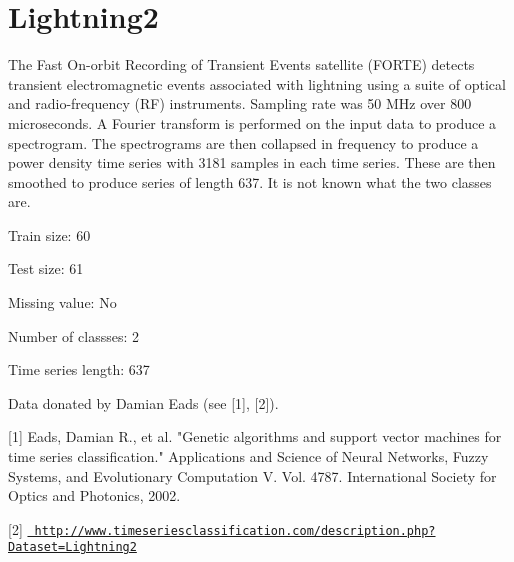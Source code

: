 \chapter{Lightning2}
\hypertarget{md_external_2data_2UCRArchive__2018_2Lightning2_2README}{}\label{md_external_2data_2UCRArchive__2018_2Lightning2_2README}
\label{md_external_2data_2UCRArchive__2018_2Lightning2_2README_autotoc_md134}%
%
 The Fast On-\/orbit Recording of Transient Events satellite (FORTE) detects transient electromagnetic events associated with lightning using a suite of optical and radio-\/frequency (RF) instruments. Sampling rate was 50 MHz over 800 microseconds. A Fourier transform is performed on the input data to produce a spectrogram. The spectrograms are then collapsed in frequency to produce a power density time series with 3181 samples in each time series. These are then smoothed to produce series of length 637. It is not known what the two classes are.

Train size\+: 60

Test size\+: 61

Missing value\+: No

Number of classses\+: 2

Time series length\+: 637

Data donated by Damian Eads (see \mbox{[}1\mbox{]}, \mbox{[}2\mbox{]}).

\mbox{[}1\mbox{]} Eads, Damian R., et al. "{}\+Genetic algorithms and support vector machines for time series classification."{} Applications and Science of Neural Networks, Fuzzy Systems, and Evolutionary Computation V. Vol. 4787. International Society for Optics and Photonics, 2002.

\mbox{[}2\mbox{]} \href{http://www.timeseriesclassification.com/description.php?Dataset=Lightning2}{\texttt{ http\+://www.\+timeseriesclassification.\+com/description.\+php?\+Dataset=\+Lightning2}} 